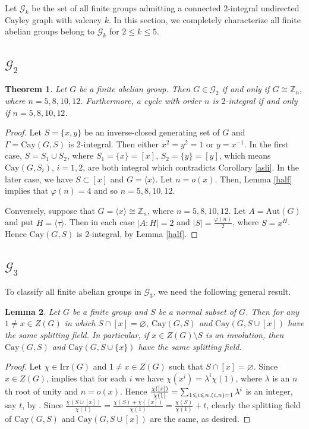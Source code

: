 \documentclass[12pt,a4paper]{article}
\newtheorem{thm}{Theorem}[section]
\newtheorem{lem}[thm]{Lemma}
\def \leq {\leqslant}
\begin{document}
	Let $\mathcal{G}_k$ be the set of all finite groups admitting a connected $2$-integral undirected Cayley graph  with valency $k$. In this section, we completely characterize all finite abelian groups belong to $\mathcal{G}_k$ for $2\leq k\leq 5$.
	
	\subsection{$\mathcal{G}_2$}
	\begin{thm}\label{2}
		Let $G$ be a finite abelian group. Then $G\in\mathcal{G}_2$ if and only if $G\cong\mathbb Z_n$, where $n=5,8,10,12$.
		Furthermore, a cycle with order $n$ is $2$-integral if and only if $n=5,8,10,12$.
	\end{thm}
	\begin{proof}
		Let $S=\{x,y\}$ be an inverse-closed generating set of $G$ and $\Gamma=\mathrm{Cay}(G,S)$ is $2$-integral. Then either $x^2=y^2=1$ or $y=x^{-1}$. In the first case, $S=S_1\cup S_2$, where
		$S_1=\{x\}=[x]$, $S_2=\{y\}=[y]$, which means $\mathrm{Cay}(G,S_i)$, $i=1,2$, are both integral which contradicts Corollary \ref{asli}. In the later case, we have $S\subset [x]$ and $G=\langle x\rangle$. Let $n=o(x)$. Then, Lemma \ref{half} implies that $\varphi(n)=4$ and so $n=5,8,10,12$. 
		
		Conversely, suppose that $G=\langle x\rangle\cong\mathbb Z_n$, where $n=5,8,10,12$. Let $A=\mathrm{Aut}(G)$ and put $H=\langle \tau\rangle$. Then in each case $|A:H|=2$ and $|S|=\frac{\varphi(n)}{2}$, where $S=x^H$.  Hence $\mathrm{Cay}(G,S)$ is $2$-integral, by Lemma \ref{half}.
	\end{proof}
	
	\subsection{$\mathcal{G}_3$}
	To classify all finite abelian groups in $\mathcal{G}_3$, we need the following general result.
	\begin{lem}\label{+1}
		Let $G$ be a finite group and $S$ be a normal subset of $G$.  Then for any $1\neq x\in Z(G)$ in which $S\cap [x]=\varnothing$, $\mathrm{Cay}(G,S)$ and $\mathrm{Cay}(G,S\cup [x])$ have the same splitting field. In particular, if $x\in Z(G)\setminus S$ is an involution, then $\mathrm{Cay}(G,S)$ and $\mathrm{Cay}(G,S\cup \{x\})$ have the same splitting field.
	\end{lem}
	\begin{proof}
		Let $\chi\in\mathrm{Irr}(G)$ and $1\neq x\in Z(G)$ such that $S\cap [x]=\varnothing$. Since $x\in Z(G)$, \cite[Exercise 5 of Chapter 13]{JL} implies that for each $i$ we have 
		$\chi(x^i)=\lambda^i\chi(1)$, where $\lambda$ is an $n$th root of unity and $n=o(x)$. Hence $\frac{\chi([x])}{\chi(1)}=\sum_{1\leq i\leq n,\\ (i,n)=1}\lambda^i$ is an integer, say $t$, by \cite[Lemma 22.15]{JL}. Since $\frac{\chi(S\cup [x])}{\chi(1)}=\frac{\chi(S)+\chi([x])}{\chi(1)}=\frac{\chi(S)}{\chi(1)}+t$, clearly the splitting field of
		$\mathrm{Cay}(G,S)$ and $\mathrm{Cay}(G,S\cup [x])$ are the same, as desired.
	\end{proof}
	
\end{document}
